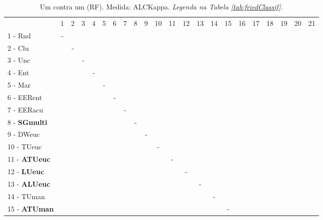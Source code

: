 \begin{table}[h]
\caption{Um contra um (RF). Medida: ALCKappa. \textit{Legenda na Tabela \ref{tab:friedClassif}.}}
\begin{center}\begin{tabular}{lcc|cc|cc|cc|cc|cc|cc|cc|cc|cc|c}
 			& 1 & 2 & 3 & 4 & 5 & 6 & 7 & 8 & 9 & 10 & 11 & 12 & 13 & 14 & 15 & 16 & 17 & 18 & 19 & 20 & 21\\
1 - Rnd  	& - &   &   &   &   &   &   &   &   &   &   &   &   &   &   &   &   &   &   &   &   \\
2 - Clu  	&   & - &   &   &   &   &   &   &   &   &   &   &   &   &   &   &   &   &   &   &   \\ \hline
3 - Unc  	&   &   & - &   &   &   &   &   &   &   &   &   &   &   &   &   &   &   &   &   &   \\
4 - Ent  	&   &   &   & - &   &   &   &   &   &   &   &   &   &   &   &   &   &   &   &   &   \\ \hline
5 - Mar  	&   &   &   &   & - &   &   &   &   &   &   &   &   &   &   &   &   &   &   &   &   \\
6 - EERent	&   &   &   &   &   & - &   &   &   &   &   &   &   &   &   &   &   &   &   &   &   \\ \hline
7 - EERacu	&   &   &   &   &   &   & - &   &   &   &   &   &   &   &   &   &   &   &   &   &   \\
8 - \textbf{SGmulti}	&   &   &   &   &   &   &   & - &   &   &   &   &   &   &   &   &   &   &   &   &   \\ \hline
9 - DWeuc	&   &   &   &   &   &   &   &   & - &   &   &   &   &   &   &   &   &   &   &   &   \\
10 - TUeuc	&   &   &   &   &   &   &   &   &   & - &   &   &   &   &   &   &   &   &   &   &   \\ \hline
11 - \textbf{ATUeuc}	&   &   &   &   &   &   &   &   &   &   & - &   &   &   &   &   &   &   &   &   &   \\
12 - \textbf{LUeuc}	&   &   &   &   &   &   &   &   &   &   &   & - &   &   &   &   &   &   &   &   &   \\ \hline
13 - \textbf{ALUeuc}	&   &   &   &   &   &   &   &   &   &   &   &   & - &   &   &   &   &   &   &   &   \\
14 - TUman	&   &   &   &   &   &   &   &   &   &   &   &   &   & - &   &   &   &   &   &   &   \\ \hline
15 - \textbf{ATUman}	&   &   &   &   &   &   &   &   &   &   &   &   &   &   & - &   &   &   &   &   &   \\

\end{tabular}
\end{center}
\end{table}
